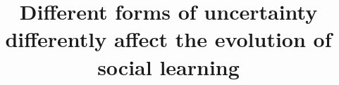 \documentclass[letterpaper,11.5pt]{scrartcl}
\title{Different forms of uncertainty differently affect the evolution of social learning}
\author{{}}
\begin{document}
\maketitle

\newcommand{\pisub}[1]{\pi_{\mathrm{#1}}}
\newcommand{\pilow}{\pisub{low}}
\newcommand{\pihigh}{\pisub{high}}
\newcommand{\piI}{\langle \pisub{I} \rangle}
\newcommand{\piS}{\langle \pisub{S} \rangle}
\newcommand{\ledger}{\bar\pi_{ib}}

\newcommand{\meanvar}[1]{\langle #1 \rangle}
\newcommand{\meansl}{\meanvar{s}}
\newcommand{\meanpi}{\meanvar{\pi}}
\newcommand{\meansoc}{\meanvar{\pi_\mathrm{S}}}
\newcommand{\meanasoc}{\meanvar{\pi_\mathrm{A}}}
\newcommand{\meanT}{\meanvar{T}}
\newcommand{\meanG}{\meanvar{G}}

\newcommand{\bandit}{\text{Bandit}_b(0, 1)}
\end{document}
